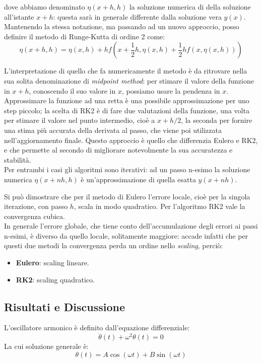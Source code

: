 dove abbiamo denominato $\eta(x+h, h)$ la soluzione numerica di della soluzione all'istante $x+h$: questa sarà in generale differente dalla soluzione vera $y(x)$.\\
Mantenendo la stessa notazione, ma passando ad un nuovo approccio, posso definire il metodo di Runge-Kutta di ordine 2 come:
\[
\eta(x+ h,h) = \eta(x,h) + h f\left(x + \frac{1}{2}h, \eta(x,h) + \frac{1}{2}hf(x, \eta(x,h))\right)
\]

L'interpretazione di quello che fa numericamente il metodo è da ritrovare nella sua solita denominazione di \textit{midpoint method}: per stimare il valore della funzione in $x+h$, conoscendo il suo valore in $x$, possiamo usare la pendenza in $x$. Approssimare la funzione ad una retta è una possibile approssimazione per uno step piccolo; la scelta di RK2 è di fare due valutazioni della funzione, una volta per stimare il valore nel punto intermedio, cioè a $x+h/2$, la seconda per fornire una stima più accurata della derivata al passo, che viene poi utilizzata nell’aggiornamento finale. Questo approccio è quello che differenzia Eulero e RK2, e che permette al secondo di migliorare notevolmente la sua accuratezza e stabilità.\\
Per entrambi i casi gli algoritmi sono iterativi: ad un passo n-esimo la soluzione numerica $\eta(x+ n h,h)$ è un'approssimazione di quella esatta $y(x + n h)$.

\medskip\noindent
Si può dimostrare che per il metodo di Eulero l'errore locale, cioè per la singola iterazione, con passo $h$, scala in modo quadratico. Per l'algoritmo RK2 vale la convergenza cubica.\\
In generale l'errore globale, che tiene conto dell'accumulazione degli errori ai passi n-esimi, è diverso da quello locale, solitamente maggiore: accade infatti che per questi due metodi la convergenza perda un ordine nello \textit{scaling}, perciò:
\begin{itemize}
    \item \textbf{Eulero}: scaling lineare.
    \item \textbf{RK2}: scaling quadratico.
\end{itemize}


\subsection{Risultati e Discussione}

L'oscillatore armonico è definito dall'equazione differenziale:
\[
\ddot\theta(t) +\omega^2 \theta(t) = 0
\]
La cui soluzione generale è:
\[
\theta(t) = A\cos(\omega t) + B\sin(\omega t)
\]

